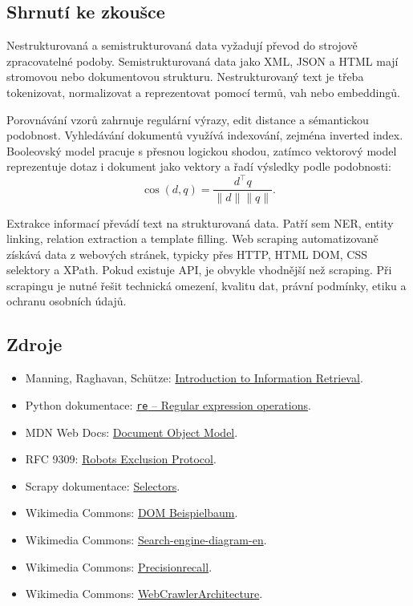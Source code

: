 \subsection{Shrnutí ke zkoušce}

Nestrukturovaná a semistrukturovaná data vyžadují převod do strojově zpracovatelné podoby. Semistrukturovaná
data jako XML, JSON a HTML mají stromovou nebo dokumentovou strukturu. Nestrukturovaný text je třeba
tokenizovat, normalizovat a reprezentovat pomocí termů, vah nebo embeddingů.

Porovnávání vzorů zahrnuje regulární výrazy, edit distance a sémantickou podobnost. Vyhledávání dokumentů
využívá indexování, zejména inverted index. Booleovský model pracuje s přesnou logickou shodou, zatímco
vektorový model reprezentuje dotaz i dokument jako vektory a řadí výsledky podle podobnosti:
\[
\cos(d,q)=\frac{d^\top q}{\|d\|\|q\|}.
\]

Extrakce informací převádí text na strukturovaná data. Patří sem NER, entity linking, relation extraction a
template filling. Web scraping automatizovaně získává data z webových stránek, typicky přes HTTP, HTML DOM,
CSS selektory a XPath. Pokud existuje API, je obvykle vhodnější než scraping. Při scrapingu je nutné řešit
technická omezení, kvalitu dat, právní podmínky, etiku a ochranu osobních údajů.

\subsection{Zdroje}

\begin{itemize}
    \item Manning, Raghavan, Schütze:
    \href{https://nlp.stanford.edu/IR-book/}{Introduction to Information Retrieval}.
    \item Python dokumentace:
    \href{https://docs.python.org/3/library/re.html}{\texttt{re} -- Regular expression operations}.
    \item MDN Web Docs:
    \href{https://developer.mozilla.org/en-US/docs/Web/API/Document\_Object\_Model}{Document Object Model}.
    \item RFC 9309:
    \href{https://www.rfc-editor.org/rfc/rfc9309}{Robots Exclusion Protocol}.
    \item Scrapy dokumentace:
    \href{https://docs.scrapy.org/en/latest/topics/selectors.html}{Selectors}.
    \item Wikimedia Commons:
    \href{https://commons.wikimedia.org/wiki/File:DOM\_Beispielbaum.svg}{DOM Beispielbaum}.
    \item Wikimedia Commons:
    \href{https://commons.wikimedia.org/wiki/File:Search-engine-diagram-en.svg}{Search-engine-diagram-en}.
    \item Wikimedia Commons:
    \href{https://commons.wikimedia.org/wiki/File:Precisionrecall.svg}{Precisionrecall}.
    \item Wikimedia Commons:
    \href{https://commons.wikimedia.org/wiki/File:WebCrawlerArchitecture.svg}{WebCrawlerArchitecture}.
\end{itemize}

\newpage
